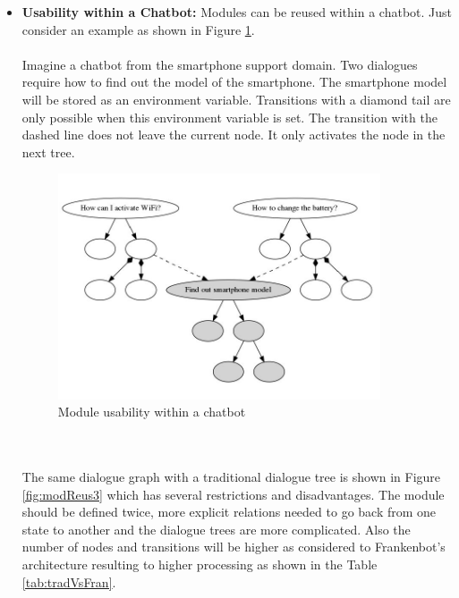 \begin{itemize}
\item \textbf{Usability within a Chatbot:} Modules can be reused within a chatbot. Just consider an example as shown in Figure \ref{fig:modReus2}. 
\\~\\
Imagine a chatbot from the smartphone support domain. Two dialogues require how to find out the model of the smartphone. The smartphone model will be stored as an environment variable. Transitions with a diamond tail are only possible when this environment variable is set. The transition with the dashed line does not leave the current node. It only activates the node in the next tree.
\begin{figure}[!h]
    \centering
    \includegraphics[width=0.9\textwidth]{img/Module_Reusability_2.PNG}
    \caption{Module usability within a chatbot}
    \label{fig:modReus2}
\end{figure} 
\\~\\
The same dialogue graph with a traditional dialogue tree is shown in Figure \ref{fig:modReus3} which has several restrictions and disadvantages. The module should be defined twice, more explicit relations needed to go back from one state to another and the dialogue trees are more complicated. Also the number of nodes and transitions will be higher as considered to Frankenbot's architecture resulting to higher processing as shown in the Table \ref{tab:tradVsFran}.
\begin{figure}[!h]
    \centering

\end{figure}
\end{itemize}
